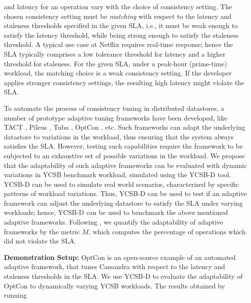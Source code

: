 \documentclass{vldb}
\begin{document}
    and latency for an operation vary with the choice of consistency setting. The chosen consistency setting must be \emph{matching} with respect to the latency and staleness thresholds specified in the
 given SLA, i.e., it must be weak enough to satisfy the latency threshold, while being strong enough to satisfy the staleness threshold. A typical use case at Netflix \cite{NetflixWorkload-Variation} requires real-time response; hence the SLA
      typically comprises a low tolerance threshold for latency and a higher threshold for staleness. For the given SLA, under a peak-hour (prime-time) workload,
      the matching choice is a weak consistency setting. If the developer applies stronger consistency settings, the resulting high latency might violate the SLA.
 \par  To automate the process of consistency tuning in distributed datastores, a number of prototype
  adaptive tuning frameworks have been developed, like TACT \cite{conf/wecwis/YuV00}, Pileus \cite{Terry:2013:CSL:2517349.2522731}, Tuba \cite{Ardekani:2014:SGC:2685048.2685077}, %
   OptCon \cite{OptCOnCCGRid2016}, etc.
     Such frameworks can adapt the underlying datastore to variations in the workload, thus ensuring that the system always satisfies the SLA.
 However, testing such capabilities require the framework to be subjected to an exhaustive set of possible
 variations in the workload.
  We propose that the adaptability of such adaptive frameworks can be evaluated with dynamic variations in YCSB benchmark workload, simulated using the YCSB-D tool.
  YCSB-D can be used to simulate real world scenarios, characterized by specific patterns of workload variations.
  Thus, YCSB-D can be used to test if an adaptive framework can adjust the underlying datastore to satisfy the
  SLA under varying workloads; hence, YCSB-D can be used to benchmark the above mentioned adaptive frameworks. 
  Following \cite{Terry:2013:CSL:2517349.2522731}, we quantify the adaptability of adaptive frameworks by the metric \emph{$M$}, which computes the percentage of operations which did not violate the SLA. %
 \par \textbf{Demonstration  Setup:}
 OptCon \cite{OptCOnCCGRid2016} is an open-source example of an automated adaptive framework, that tunes Cassandra with respect to the latency and staleness thresholds in the SLA.
 We use YCSB-D to evaluate the adaptability of OptCon to dynamically varying YCSB workloads. The results obtained by running
\end{document}
